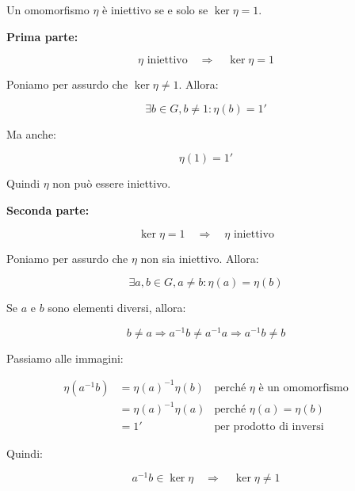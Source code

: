 \begin{lemma}
	\label{lmm:omomorfismo_iniettivo}
	Un omomorfismo $\eta$ è iniettivo se e solo se $\ker \eta = 1$.
\end{lemma}
\begin{dimostrazione}
	\textbf{Prima parte:}
	
	\begin{equation}
		\eta \text{ iniettivo} \quad\Longrightarrow\quad \ker \eta = 1
	\end{equation}
	
	Poniamo per assurdo che $\ker \eta \ne 1$. Allora:
	
	\begin{equation}
		\exists b \in G, b \ne 1 : \eta(b) = 1'
	\end{equation}

	Ma anche:
	
	\begin{equation}
		\eta(1) = 1'
	\end{equation} 

	Quindi $\eta$ non può essere iniettivo.
	
	\textbf{Seconda parte:}
	
	\begin{equation}
		\ker \eta = 1 \quad\Longrightarrow\quad \eta \text{ iniettivo}
	\end{equation}
	
	Poniamo per assurdo che $\eta$ non sia iniettivo. Allora:
	
	\begin{equation}
		\exists a, b \in G, a \ne b : \eta(a) = \eta(b)
	\end{equation}

	Se $a$ e $b$ sono elementi diversi, allora:
	
	\begin{equation}
		b \ne a \Longrightarrow a^{-1}b \ne a^{-1}a \Longrightarrow a^{-1}b \ne b
	\end{equation}

	Passiamo alle immagini:
	
	\begin{align}
		\eta(a^{-1}b) &= \eta(a)^{-1}\eta(b) &\text{perché $\eta$ è un omomorfismo} \\
		&=\eta(a)^{-1}\eta(a) &\text{perché $\eta(a)=\eta(b)$} \\
		&=1' &\text{per prodotto di inversi}
	\end{align}

	Quindi:
	
	\begin{equation}
		a^{-1}b \in \ker \eta \quad\Longrightarrow\quad \ker \eta \ne 1
	\end{equation}
	
\end{dimostrazione}

